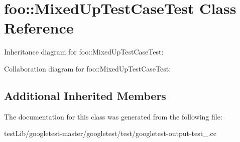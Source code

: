 \hypertarget{classfoo_1_1MixedUpTestCaseTest}{}\section{foo\+:\+:Mixed\+Up\+Test\+Case\+Test Class Reference}
\label{classfoo_1_1MixedUpTestCaseTest}


Inheritance diagram for foo\+:\+:Mixed\+Up\+Test\+Case\+Test\+:


Collaboration diagram for foo\+:\+:Mixed\+Up\+Test\+Case\+Test\+:
\subsection*{Additional Inherited Members}


The documentation for this class was generated from the following file\+:\begin{DoxyCompactItemize}
\item 
test\+Lib/googletest-\/master/googletest/test/googletest-\/output-\/test\+\_\+.\+cc\end{DoxyCompactItemize}
